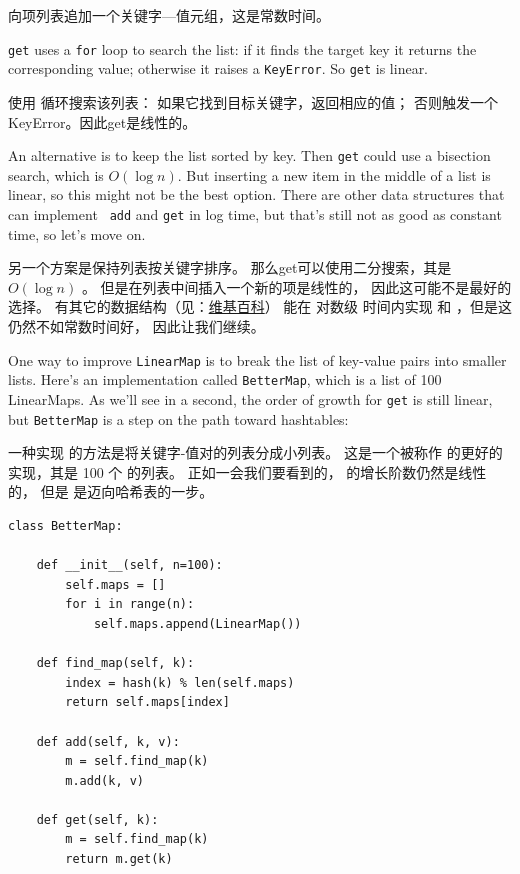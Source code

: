  向项列表追加一个关键字---值元组，这是常数时间。

{\tt get} uses a {\tt for} loop to search the list:
if it finds the target key it returns the corresponding value;
otherwise it raises a {\tt KeyError}.
So {\tt get} is linear.

 使用  循环搜索该列表： 如果它找到目标关键字，返回相应的值；
否则触发一个KeyError。因此get是线性的。

An alternative is to keep the list sorted by key.  Then {\tt get}
could use a bisection search, which is $O(\log n)$.  But inserting a
new item in the middle of a list is linear, so this might not be the
best option.  There are other data structures that can implement {\tt
  add} and {\tt get} in log time, but that's still not as good as
constant time, so let's move on.

另一个方案是保持列表按关键字排序。
那么get可以使用二分搜索，其是 $O(\log n)$ 。
但是在列表中间插入一个新的项是线性的， 因此这可能不是最好的选择。
有其它的数据结构（见：\href{http://en.wikipedia.org/wiki/Red-black_tree}{维基百科}）
能在 对数级 时间内实现  和 ，但是这仍然不如常数时间好，
因此让我们继续。

One way to improve {\tt LinearMap} is to break the list of key-value
pairs into smaller lists.  Here's an implementation called
{\tt BetterMap}, which is a list of 100 LinearMaps.  As we'll see
in a second, the order of growth for {\tt get} is still linear,
but {\tt BetterMap} is a step on the path toward hashtables:

一种实现  的方法是将关键字-值对的列表分成小列表。
这是一个被称作  的更好的实现，其是 100 个  的列表。
正如一会我们要看到的， 的增长阶数仍然是线性的，
但是  是迈向哈希表的一步。

\begin{lstlisting}
class BetterMap:

    def __init__(self, n=100):
        self.maps = []
        for i in range(n):
            self.maps.append(LinearMap())

    def find_map(self, k):
        index = hash(k) % len(self.maps)
        return self.maps[index]

    def add(self, k, v):
        m = self.find_map(k)
        m.add(k, v)

    def get(self, k):
        m = self.find_map(k)
        return m.get(k)
\end{lstlisting}

